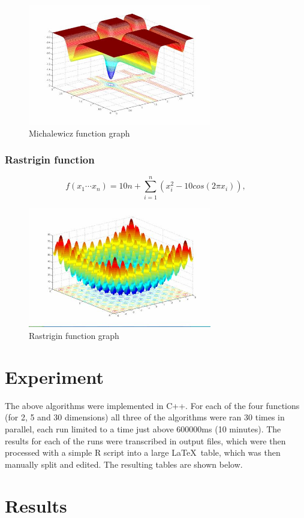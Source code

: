 \documentclass{article}
\begin{document}
	\begin{figure}[h]
		\includegraphics[height=150pt,keepaspectratio]{images/michalewicz-graph.jpg}
		\caption{Michalewicz function graph}
	\end{figure}

	\subsubsection{Rastrigin function}
	$$f(x_1 \cdots x_n) = 10n + \sum_{i=1}^n (x_i^2 -10cos(2\pi x_i)),$$

	\begin{figure}[h]
		\includegraphics[height=150pt,keepaspectratio]{images/rastrigin-graph.jpg}
		\caption{Rastrigin function graph}
	\end{figure}
	
	\section{Experiment}
	The above algorithms were implemented in C++. For each of the four functions (for 2, 5 and 30 dimensions) all three of the algorithms were ran 30 times in parallel, each run limited to a time just above 600000ms (10 minutes). The results for each of the runs were transcribed in output files, which were then processed with a simple R script into a large \LaTeX\ table, which was then manually split and edited. The resulting tables are shown below.
    \section{Results}
\end{document}

